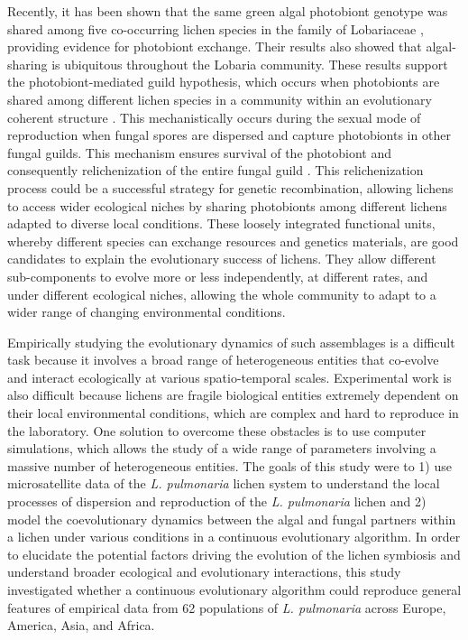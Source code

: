 \documentclass[fleqn,10pt]{wlscirep}
\begin{document}
Recently, it has been shown that the same green algal photobiont genotype was shared among five co-occurring lichen species in the family of Lobariaceae \cite{dal2011phylogeny}, providing evidence for photobiont exchange. Their results also showed that algal-sharing is ubiquitous throughout the Lobaria community. These results support the photobiont-mediated guild hypothesis, which occurs when photobionts are shared among different lichen species in a community within an evolutionary coherent structure \cite{rikkinen2003ecological}. This mechanistically occurs during the sexual mode of reproduction when fungal spores are dispersed and capture photobionts in other fungal guilds\cite{friedl1987thallus}. This mechanism ensures survival of the photobiont and consequently relichenization of the entire fungal guild \cite{dal2011phylogeny}. This relichenization process could be a successful strategy for genetic recombination, allowing lichens to access wider ecological niches by sharing photobionts among different lichens adapted to diverse local conditions. These loosely integrated functional units, whereby different species can exchange resources and genetics materials, are good candidates to explain the evolutionary success of lichens. They allow different sub-components to evolve more or less independently, at different rates, and under different ecological niches, allowing the whole community to adapt to a wider range of changing environmental conditions.

Empirically studying the evolutionary dynamics of such assemblages is a difficult task because it involves a broad range of heterogeneous entities that co-evolve and interact ecologically at various spatio-temporal scales. Experimental work is also difficult because lichens are fragile biological entities extremely dependent on their local environmental conditions, which are complex and hard to reproduce in the laboratory\cite{nash1996lichen}. One solution to overcome these obstacles is to use computer simulations, which allows the study of a wide range of parameters involving a massive number of heterogeneous entities. The goals of this study were to 1) use microsatellite data \cite{dal2012vertical} of the \textit{L. pulmonaria} lichen system to understand the local processes of dispersion and reproduction of the {\em L. pulmonaria} lichen and 2) model the coevolutionary dynamics between the algal and fungal partners within a lichen under various conditions in a continuous evolutionary algorithm. In order to elucidate the potential factors driving the evolution of the lichen symbiosis and understand broader ecological and evolutionary interactions, this study investigated whether a continuous evolutionary algorithm could reproduce general features of empirical data from 62 populations of \textit{L. pulmonaria} across Europe, America, Asia, and Africa.
\end{document}

